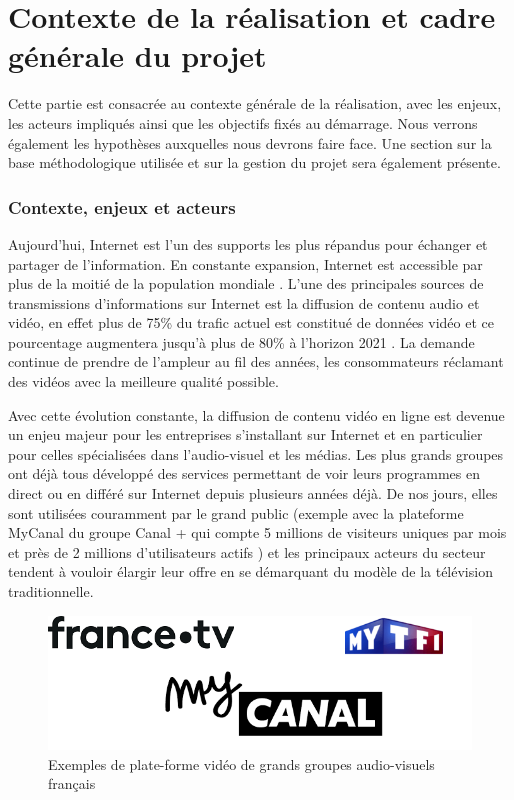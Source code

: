 \documentclass{polytech/polytech}
\begin{document}
\part{Contexte de la réalisation et cadre générale du projet}


Cette partie est consacrée au contexte générale de la réalisation, avec les enjeux, les acteurs impliqués ainsi que les objectifs fixés au démarrage. Nous verrons également les hypothèses auxquelles nous devrons faire face. Une section sur la base méthodologique utilisée et sur la gestion du projet sera également présente.

\section{Contexte, enjeux et acteurs}


Aujourd’hui, Internet est l’un des supports les plus répandus pour échanger et partager de l’information. En constante expansion, Internet est accessible par plus de la moitié de la population mondiale \cite{_chiffres_2017}. L’une des principales sources de transmissions d'informations sur Internet est la diffusion de contenu audio et vidéo, en effet plus de 75\% du trafic actuel est constitué de données vidéo et ce pourcentage augmentera jusqu’à plus de 80\% à l’horizon 2021 \cite{_cisco_2017}. La demande continue de prendre de l’ampleur au fil des années, les consommateurs réclamant des vidéos avec la meilleure qualité possible.

Avec cette évolution constante, la diffusion de contenu vidéo en ligne est devenue un enjeu majeur pour les entreprises s’installant sur Internet et en particulier pour celles spécialisées dans l’audio-visuel et les médias. Les plus grands groupes ont déjà tous développé des services permettant de voir leurs programmes en direct ou en différé sur Internet depuis plusieurs années déjà. De nos jours, elles sont utilisées couramment par le grand public (exemple avec la plateforme MyCanal du groupe Canal + qui compte 5 millions de visiteurs uniques par mois et près de 2 millions d’utilisateurs actifs \cite{sancerre_canal+_2017}) et les principaux acteurs du secteur tendent à vouloir élargir leur offre en se démarquant du modèle de la télévision traditionnelle.


\begin{figure}
	\includegraphics[scale=0.75]{images/exemple_sites.png}
	\caption{Exemples de plate-forme vidéo de grands groupes audio-visuels français}
	\label{fig:ex_plate-formes}
\end{figure}
\end{document}
